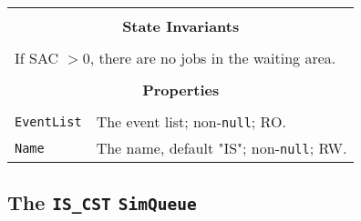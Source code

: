 \documentclass[12pt]{book}
\begin{document}
\begin{tabular}{|l|l|l|}
\hline
\multicolumn{3}{|c|}{} \\
\multicolumn{3}{|c|}{\bf State  Invariants} \\
\multicolumn{3}{|c|}{} \\
\hline
\multicolumn{3}{|l|}{If SAC $> 0$, there are no jobs in the waiting area.} \\
\hline
\multicolumn{3}{|c|}{} \\
\multicolumn{3}{|c|}{\bf Properties} \\
\multicolumn{3}{|c|}{} \\
\hline
\lstinline|EventList|       & \multicolumn{2}{|l|}{The event list; non-\lstinline|null|; RO.} \\
\hline
\lstinline|Name|            & \multicolumn{2}{|l|}{The name, default "IS"; non-\lstinline|null|; RW.} \\
\hline
\end{tabular}

\subsection{The \lstinline{IS_CST} \lstinline{SimQueue}}
\end{document}
